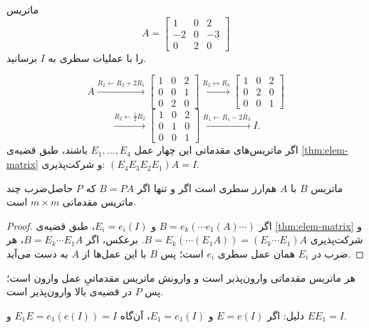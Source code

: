 \begin{example}
ماتریس 
\[
A=\begin{bmatrix}1&0&2\\-2&0&-3\\0&2&0\end{bmatrix}
\]
را با عملیات سطری به $I$ برسانید.
\end{example}
\begin{solution}
\[
A\xrightarrow{R_2\leftarrow R_2+2R_1}\begin{bmatrix}1&0&2\\0&0&1\\0&2&0\end{bmatrix}
\xrightarrow{R_2\leftrightarrow R_3}\begin{bmatrix}1&0&2\\0&2&0\\0&0&1\end{bmatrix}
\]
\[
\xrightarrow{R_2\leftarrow\frac12R_2}\begin{bmatrix}1&0&2\\0&1&0\\0&0&1\end{bmatrix}
\xrightarrow{R_1\leftarrow R_1-2R_3}I .
\]
اگر ماتریس‌های مقدماتی این چهار عمل $E_1,\dots,E_4$ باشند، طبق قضیه‌ی \ref{thm:elem-matrix} و شرکت‌پذیری:
$(E_4E_3E_2E_1)A=I$.
\end{solution}

\begin{theorem}\label{thm:row-equiv-PA}
ماتریس $B$ با $A$ هم‌ارز سطری است اگر و تنها اگر $B=PA$ که $P$ حاصل‌ضرب چند ماتریس مقدماتی  $m\times m$ است.
\end{theorem}
\begin{proof}
اگر $B=e_k(\cdots e_1(A)\cdots)$ و $E_i=e_i(I)$، طبق قضیه‌ی \ref{thm:elem-matrix} و شرکت‌پذیری $B=E_k(\cdots(E_1A))=(E_k\cdots E_1)A$. برعکس، اگر $B=E_k\cdots E_1A$، هر ضرب در $E_i$ همان عمل سطری $e_i$ است؛ پس $B$ با این عمل‌ها از $A$ به دست می‌آید.
\end{proof}

\begin{corollary}\label{cor:elem-invertible}
هر ماتریس مقدماتی وارون‌پذیر است و وارونش ماتریس مقدماتیِ عمل وارون است؛ پس $P$ در قضیه‌ی بالا وارون‌پذیر است.
\end{corollary}
دلیل: اگر $E=e(I)$ و $E_1=e_1(I)$، آن‌گاه $E_1E=e_1(e(I))=I$ و $EE_1=I$.

